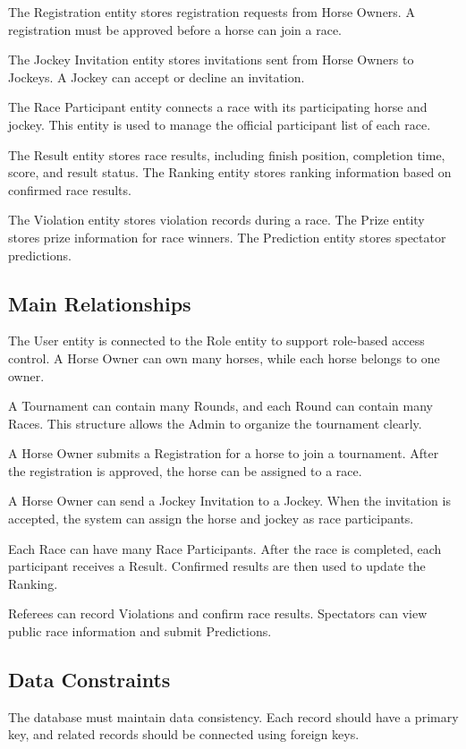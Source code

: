 The Registration entity stores registration requests from Horse Owners. A registration must be approved before a horse can join a race.

The Jockey Invitation entity stores invitations sent from Horse Owners to Jockeys. A Jockey can accept or decline an invitation.

The Race Participant entity connects a race with its participating horse and jockey. This entity is used to manage the official participant list of each race.

The Result entity stores race results, including finish position, completion time, score, and result status. The Ranking entity stores ranking information based on confirmed race results.

The Violation entity stores violation records during a race. The Prize entity stores prize information for race winners. The Prediction entity stores spectator predictions.

\subsection{Main Relationships}

The User entity is connected to the Role entity to support role-based access control. A Horse Owner can own many horses, while each horse belongs to one owner.

A Tournament can contain many Rounds, and each Round can contain many Races. This structure allows the Admin to organize the tournament clearly.

A Horse Owner submits a Registration for a horse to join a tournament. After the registration is approved, the horse can be assigned to a race.

A Horse Owner can send a Jockey Invitation to a Jockey. When the invitation is accepted, the system can assign the horse and jockey as race participants.

Each Race can have many Race Participants. After the race is completed, each participant receives a Result. Confirmed results are then used to update the Ranking.

Referees can record Violations and confirm race results. Spectators can view public race information and submit Predictions.

\subsection{Data Constraints}

The database must maintain data consistency. Each record should have a primary key, and related records should be connected using foreign keys.

